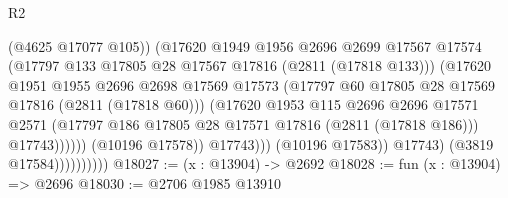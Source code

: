 \begin{lexlean}{R2}
\begin{coremodule}
                                          (@4625 @17077 @105))
                                        (@17620
                                          @1949
                                          @1956
                                          @2696
                                          @2699
                                          @17567
                                          @17574
                                          (@17797
                                            @133
                                            @17805
                                            @28
                                            @17567
                                            @17816
                                            (@2811 (@17818 @133)))
                                          (@17620
                                            @1951
                                            @1955
                                            @2696
                                            @2698
                                            @17569
                                            @17573
                                            (@17797
                                              @60
                                              @17805
                                              @28
                                              @17569
                                              @17816
                                              (@2811 (@17818 @60)))
                                            (@17620
                                              @1953
                                              @115
                                              @2696
                                              @2696
                                              @17571
                                              @2571
                                              (@17797
                                                @186
                                                @17805
                                                @28
                                                @17571
                                                @17816
                                                (@2811 (@17818 @186)))
                                              @17743))))))
                                  (@10196 @17578))
                                @17743)))
                          (@10196 @17583))
                        @17743)
                      (@3819 @17584))))))))))
@18027 := (x : @13904) -> @2692
@18028 := fun (x : @13904) => @2696
@18030 := @2706 @1985 @13910

\end{coremodule}
\end{lexlean}
